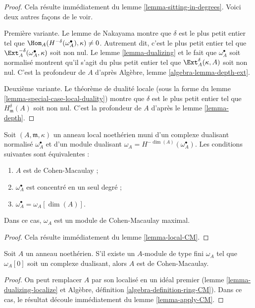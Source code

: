 \begin{proof}
Cela résulte immédiatement du lemme \ref{lemma-sitting-in-degrees}.
Voici deux autres façons de le voir.

\medskip\noindent
Première variante. Le lemme de Nakayama montre que $\delta$
est le plus petit entier tel que $\Hom_A(H^{-\delta}(\omega_A^\bullet), \kappa) \not = 0$.
Autrement dit, c'est le plus petit entier tel que $\Ext_A^{-\delta}(\omega_A^\bullet, \kappa)$ soit non nul.
Le lemme \ref{lemma-dualizing} et le fait que $\omega_A^\bullet$ soit normalisé montrent qu'il s'agit
du plus petit entier tel que $\Ext_A^\delta(\kappa, A)$ soit non nul.
C'est la profondeur de $A$ d'après Algèbre, lemme \ref{algebra-lemma-depth-ext}.

\medskip\noindent
Deuxième variante. Le théorème de dualité locale
(sous la forme du lemme \ref{lemma-special-case-local-duality}) montre que $\delta$ est le plus petit entier
tel que $H^\delta_\mathfrak m(A)$ soit non nul. C'est la profondeur de $A$
d'après le lemme \ref{lemma-depth}.
\end{proof}

\begin{lemma}
\label{lemma-apply-CM}
Soit $(A, \mathfrak m, \kappa)$ un anneau local noethérien muni d'un complexe dualisant normalisé $\omega_A^\bullet$
et d'un module dualisant $\omega_A = H^{-\dim(A)}(\omega_A^\bullet)$. Les conditions suivantes sont équivalentes :
\begin{enumerate}
\item $A$ est de Cohen-Macaulay ;
\item $\omega_A^\bullet$ est concentré en un seul degré ;
\item $\omega_A^\bullet = \omega_A[\dim(A)]$.
\end{enumerate}
Dans ce cas, $\omega_A$ est un module de Cohen-Macaulay maximal.
\end{lemma}

\begin{proof}
Cela résulte immédiatement du lemme \ref{lemma-local-CM}.
\end{proof}

\begin{lemma}
\label{lemma-has-dualizing-module-CM}
Soit $A$ un anneau noethérien. S'il existe un $A$-module de type fini $\omega_A$
tel que $\omega_A[0]$ soit un complexe dualisant, alors $A$ est de Cohen-Macaulay.
\end{lemma}

\begin{proof}
On peut remplacer $A$ par son localisé en un idéal premier
(lemme \ref{lemma-dualizing-localize} et Algèbre, définition \ref{algebra-definition-ring-CM}).
Dans ce cas, le résultat découle immédiatement du lemme \ref{lemma-apply-CM}.
\end{proof}

